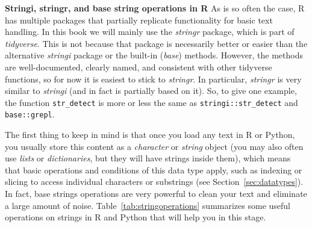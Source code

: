 \begin{feature}\textbf{Stringi, stringr, and base string operations in R}
  As is so often the case, R has multiple packages that partially replicate functionality for basic text handling.
  In this book we will mainly use the \emph{stringr} package, which is part of \emph{tidyverse}.
  This is not because that package is necessarily better or easier than the alternative \emph{stringi} package
  or the built-in (\emph{base}) methods.
  However, the methods are well-documented, clearly named, and consistent with other tidyverse functions,
  so for now it is easiest to stick to \emph{stringr}.
  In particular, \emph{stringr} is very similar to \emph{stringi} (and in fact is partially based on it).
  So, to give one example, the function \texttt{str\_detect} is more or less the same as \texttt{stringi::str\_detect} and \texttt{base::grepl}.
\end{feature}

The first thing to keep in mind is that once you load any text in R or Python, you usually store this content as a \emph{character} or \emph{string} object (you may also often use \emph{lists} or \emph{dictionaries}, but they will have strings inside them), which means that basic operations and conditions of this data type apply, such as indexing or slicing to access individual characters or substrings (see Section~\ref{sec:datatypes}). In fact, base strings operations are very powerful to clean your text and eliminate a large amount of noise.  Table~\ref{tab:stringoperations} summarizes some useful operations on strings in R and Python that will help you in this stage.

